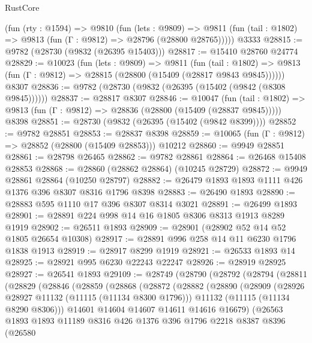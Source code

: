 \begin{lexlean}{RustCore}
\begin{coremodule}
    (fun (rty : @1594) =>
    @9810
      (fun (lets : @9809) =>
      @9811 (fun (tail : @1802) => @9813 (fun (Γ : @9812) => @28796 (@28800 @28765)))))
    @3333
@28815 := @9782 (@28730 (@9832 (@26395 @15403)))
@28817 := @15410 @28760 @24774
@28829 := @10023
    (fun (lets : @9809) =>
    @9811
      (fun (tail : @1802) =>
      @9813 (fun (Γ : @9812) => @28815 (@28800 (@15409 (@28817 @9843 @9845))))))
    @8307
@28836 := @9782 (@28730 (@9832 (@26395 (@15402 (@9842 (@8308 @9845))))))
@28837 := @28817 @8307
@28846 := @10047
    (fun (tail : @1802) => @9813 (fun (Γ : @9812) => @28836 (@28800 (@15409 (@28837 @9845)))))
    @8398
@28851 := @28730 (@9832 (@26395 (@15402 (@9842 @8399))))
@28852 := @9782 @28851
@28853 := @28837 @8398
@28859 := @10065 (fun (Γ : @9812) => @28852 (@28800 (@15409 @28853))) @10212
@28860 := @9949 @28851
@28861 := @28798 @26465
@28862 := @9782 @28861
@28864 := @26468 @15408 @28853
@28868 := @28860 (@28862 @28864) (@10245 @28729)
@28872 := @9949 @28861 @28864 (@10250 @28797)
@28882 := @26479 @1893 @1893 @1111 @426 @1376 @396 @8307 @8316 @1796 @8398
@28883 := @26490 @1893
@28890 := @28883 @595 @1110 @17 @396 @8307 @8314 @3021
@28891 := @26499 @1893
@28901 := @28891 @224 @998 @14 @16 @1805 @8306 @8313 @1913 @8289 @1919
@28902 := @26511 @1893
@28909 := @28901 (@28902 @52 @14 @52 @1805 @26654 @10308)
@28917 := @28891 @996 @258 @14 @11 @6230 @1796 @1838 @1913
@28919 := @28917 @8299 @1919
@28921 := @26533 @1893 @14
@28925 := @28921 @995 @6230 @22243 @22247
@28926 := @28919 @28925
@28927 := @26541 @1893
@29109 := @28749
    (@28790
      (@28792
        (@28794
          (@28811
            (@28829
              (@28846
                (@28859
                  (@28868
                    (@28872
                      (@28882
                        (@28890
                          (@28909
                            (@28926 @28927 @11132 (@11115 (@11134 @8300 @1796)))
                            @11132
                            (@11115 (@11134 @8290 @8306)))
                          @14601
                          @14604
                          @14607
                          @14611
                          @14616
                          @16679)
                        (@26563
                          @1893
                          @1893
                          @11189
                          @8316
                          @426
                          @1376
                          @396
                          @1796
                          @2218
                          @8387
                          @8396
                          (@26580

\end{coremodule}
\end{lexlean}
